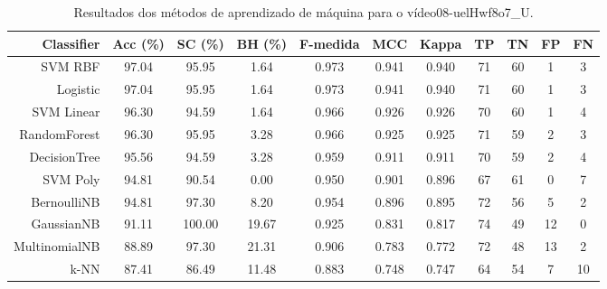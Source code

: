 \begin{table}[!htb]
\centering
\caption{Resultados dos métodos de aprendizado de máquina para o vídeo08-uelHwf8o7_U.}
\label{tab:08-uelHwf8o7_U}
\begin{tabular}{r|c|c|c|c|c|c|c|c|c|c}
\hline\hline
Classifier & Acc (\%) & SC (\%) & BH (\%) & F-medida & MCC & Kappa & TP & TN & FP & FN \\ \hline
SVM RBF & 97.04 & 95.95 & 1.64 & 0.973 & 0.941 & 0.940 & 71 & 60 & 1 & 3 \\ 
Logistic & 97.04 & 95.95 & 1.64 & 0.973 & 0.941 & 0.940 & 71 & 60 & 1 & 3 \\ 
SVM Linear & 96.30 & 94.59 & 1.64 & 0.966 & 0.926 & 0.926 & 70 & 60 & 1 & 4 \\ 
RandomForest & 96.30 & 95.95 & 3.28 & 0.966 & 0.925 & 0.925 & 71 & 59 & 2 & 3 \\ 
DecisionTree & 95.56 & 94.59 & 3.28 & 0.959 & 0.911 & 0.911 & 70 & 59 & 2 & 4 \\ 
SVM Poly & 94.81 & 90.54 & 0.00 & 0.950 & 0.901 & 0.896 & 67 & 61 & 0 & 7 \\ 
BernoulliNB & 94.81 & 97.30 & 8.20 & 0.954 & 0.896 & 0.895 & 72 & 56 & 5 & 2 \\ 
GaussianNB & 91.11 & 100.00 & 19.67 & 0.925 & 0.831 & 0.817 & 74 & 49 & 12 & 0 \\ 
MultinomialNB & 88.89 & 97.30 & 21.31 & 0.906 & 0.783 & 0.772 & 72 & 48 & 13 & 2 \\ 
k-NN & 87.41 & 86.49 & 11.48 & 0.883 & 0.748 & 0.747 & 64 & 54 & 7 & 10 \\ 
\hline\hline
\end{tabular}
\end{table}
